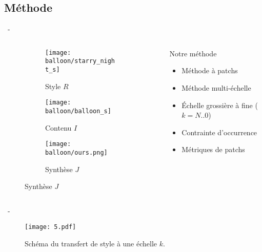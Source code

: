 \documentclass[aspectratio=169, 22pt]{beamer}
\begin{document}
\subsection{Méthode}
\begin{frame}{\secname~- \subsecname}
  \begin{columns}
    \begin{column}{0.4\linewidth}
      \begin{figure}
        \centering
        \begin{subfigure}{0.45\linewidth}\centering
          \texttt{[image: balloon/starry\_night\_s]}
          \caption{Style $R$}
        \end{subfigure}
        \begin{subfigure}{0.45\linewidth}\centering        
          \texttt{[image: balloon/balloon\_s]}
          \caption{Contenu $I$}
        \end{subfigure}

        \begin{subfigure}{0.8\linewidth}\centering
          \texttt{[image: balloon/ours.png]}
          \caption{Synthèse $J$}
        \end{subfigure}
      \end{figure}
    \end{column}
    \begin{column}{0.6\linewidth}
      \begin{exampleblock}{Notre méthode}
        \begin{itemize}
        \item Méthode à patchs
        \item Méthode multi-échelle
        \item Échelle grossière à fine ($k=N..0$)
          \vspace{1em}
          \pause
        \item \alert{Contrainte d'occurrence}
        \item \alert{Métriques de patchs}
        \end{itemize}
      \end{exampleblock}
    \end{column}
  \end{columns}
\end{frame}

\begin{frame}{\secname~- \subsecname}
  \begin{figure}
    \centering
    \texttt{[image: 5.pdf]}
    \caption{Schéma du transfert de style à une échelle $k$.}
  \end{figure}
\end{frame}
\end{document}
